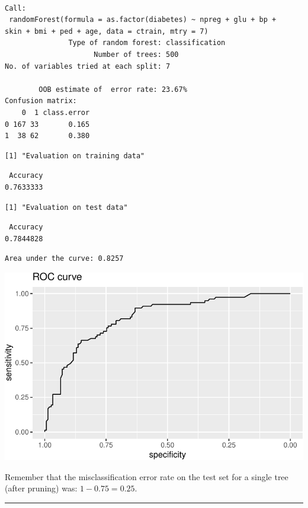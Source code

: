 \documentclass[
  letterpaper,
  DIV=11,
  numbers=noendperiod]{scrartcl}
\begin{document}
\begin{verbatim}

Call:
 randomForest(formula = as.factor(diabetes) ~ npreg + glu + bp +      skin + bmi + ped + age, data = ctrain, mtry = 7) 
               Type of random forest: classification
                     Number of trees: 500
No. of variables tried at each split: 7

        OOB estimate of  error rate: 23.67%
Confusion matrix:
    0  1 class.error
0 167 33       0.165
1  38 62       0.380
\end{verbatim}

\begin{verbatim}
[1] "Evaluation on training data"
\end{verbatim}

\begin{verbatim}
 Accuracy 
0.7633333 
\end{verbatim}

\begin{verbatim}
[1] "Evaluation on test data"
\end{verbatim}

\begin{verbatim}
 Accuracy 
0.7844828 
\end{verbatim}

\begin{verbatim}
Area under the curve: 0.8257
\end{verbatim}

\includegraphics{L13_files/figure-pdf/unnamed-chunk-20-1.pdf}

Remember that the misclassification error rate on the test set for a
single tree (after pruning) was: \(1-0.75=0.25\).

\begin{center}\rule{0.5\linewidth}{0.5pt}\end{center}
\end{document}
